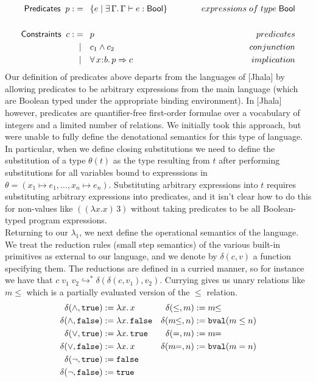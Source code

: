 \documentclass[11pt]{article}
\newcommand{\bind}{\hspace{0.05em}{:}\hspace{0.05em}} %
\newcommand{\many}{\hookrightarrow^*}
\newcommand{\true}{\mathtt{true}}
\begin{document}
\begin{align*}
{\sf Predicates} \;\; p :&=\;\: \{ e \;|\; \exists\, \Gamma.\, 
                   \Gamma \vdash e : {\sf Bool}\}
                   {\kern 3 em}& expressions\; of\; type\; {\sf Bool} \\ \\
{\sf Constraints} \;\; c :&=\;\: p  {\kern 3 em}& predicates\\
                   &\;\;|\quad c_1 \wedge c_2 & conjunction\\
                   &\;\;|\quad\forall\, x\bind b.\, p\Rightarrow c
                   &implication
\end{align*}
Our definition of predicates above departs from the languages of [Jhala] by allowing predicates to be arbitrary expressions from the main language (which are Boolean typed under the appropriate binding environment).
In [Jhala] however, predicates are quantifier-free first-order formulae over a vocabulary of integers and a limited number of relations. We initially took this approach, but were unable to fully define the denotational semantics for this type of language. In particular, when we define closing substitutions we need to define the substitution of a type $\theta(t)$ as the type resulting from $t$ after performing substitutions for all variables bound to expresssions in
$\theta = (x_1 \mapsto e_1, \ldots, x_n \mapsto e_n)$. Substituting arbitrary expressions into $t$ requires substituting arbitrary expressions into predicates, and it isn't clear how to do this for non-values like $((\lambda x. x)\, 3)$ without taking predicates to be all Boolean-typed program expressions. \\

Returning to our $\lambda_1$, we next define the operational semantics of the language. We treat the reduction rules (small step semantics) of the various built-in primitives as external to our language, and we denote by $\delta(c,v)$ a function specifying them. The reductions are defined in a curried manner, so for instance we have that 
$c\; v_1\; v_2 \many \delta(\delta(c,v_1),v_2)$. Currying gives us unary relations like $m\!\!\leq$ which is a partially evaluated version of the $\leq$ relation.
\begin{align*}
\delta(\wedge,\true) &:= \lambda x.\, x &
  \delta(\leq,m) &:= m\!\!\leq \\
\delta(\wedge,{\tt false}) &:= \lambda x.\, {\tt false} &
  \delta(m\!\!\leq, n) &:= {\tt bval}(m \leq n)\\
\delta(\vee,\true) &:= \lambda x.\, \true &
  \delta(=,m) &:= m\!\!= \\
\delta(\vee,{\tt false}) &:= \lambda x.\, x &
  \delta(m\!\!=, n) &:= {\tt bval}(m = n) \\ 
\delta(\neg,\true) &:= {\tt false}\\
\delta(\neg,{\tt false}) &:= \true 
\end{align*}
\end{document}
